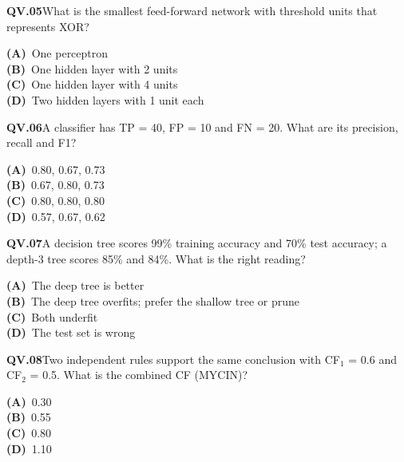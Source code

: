 \begin{tcolorbox}[enhanced,breakable,colback=white,colframe=navyL,arc=2mm,boxrule=0.7pt,left=3mm,right=3mm,top=2mm,bottom=2mm]
\textbf{\color{navy}QV.05}\quad What is the smallest feed-forward network with threshold units that represents XOR?\hfill{}\par\smallskip
{\small \textbf{\color{navyL}(A)}\ One perceptron\\[1pt]\textbf{\color{navyL}(B)}\ One hidden layer with 2 units\\[1pt]\textbf{\color{navyL}(C)}\ One hidden layer with 4 units\\[1pt]\textbf{\color{navyL}(D)}\ Two hidden layers with 1 unit each}
\end{tcolorbox}
\begin{tcolorbox}[enhanced,breakable,colback=white,colframe=navyL,arc=2mm,boxrule=0.7pt,left=3mm,right=3mm,top=2mm,bottom=2mm]
\textbf{\color{navy}QV.06}\quad A classifier has TP = 40, FP = 10 and FN = 20. What are its precision, recall and F1?\hfill{}\par\smallskip
{\small \textbf{\color{navyL}(A)}\ 0.80, 0.67, 0.73\\[1pt]\textbf{\color{navyL}(B)}\ 0.67, 0.80, 0.73\\[1pt]\textbf{\color{navyL}(C)}\ 0.80, 0.80, 0.80\\[1pt]\textbf{\color{navyL}(D)}\ 0.57, 0.67, 0.62}
\end{tcolorbox}
\begin{tcolorbox}[enhanced,breakable,colback=white,colframe=navyL,arc=2mm,boxrule=0.7pt,left=3mm,right=3mm,top=2mm,bottom=2mm]
\textbf{\color{navy}QV.07}\quad A decision tree scores 99\% training accuracy and 70\% test accuracy; a depth-3 tree scores 85\% and 84\%. What is the right reading?\hfill{}\par\smallskip
{\small \textbf{\color{navyL}(A)}\ The deep tree is better\\[1pt]\textbf{\color{navyL}(B)}\ The deep tree overfits; prefer the shallow tree or prune\\[1pt]\textbf{\color{navyL}(C)}\ Both underfit\\[1pt]\textbf{\color{navyL}(D)}\ The test set is wrong}
\end{tcolorbox}
\begin{tcolorbox}[enhanced,breakable,colback=white,colframe=navyL,arc=2mm,boxrule=0.7pt,left=3mm,right=3mm,top=2mm,bottom=2mm]
\textbf{\color{navy}QV.08}\quad Two independent rules support the same conclusion with CF$_1$ = 0.6 and CF$_2$ = 0.5. What is the combined CF (MYCIN)?\hfill{}\par\smallskip
{\small \textbf{\color{navyL}(A)}\ 0.30\\[1pt]\textbf{\color{navyL}(B)}\ 0.55\\[1pt]\textbf{\color{navyL}(C)}\ 0.80\\[1pt]\textbf{\color{navyL}(D)}\ 1.10}
\end{tcolorbox}
